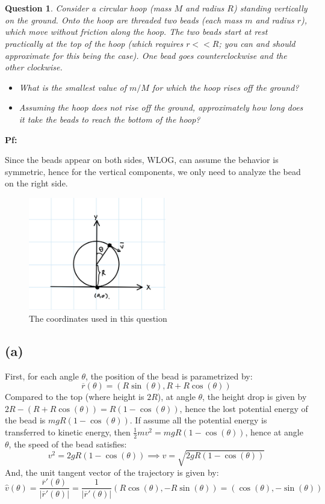 \documentclass{article}
\newtheorem{question}{Question}
\newcommand{\br}{\overline{r}}
\begin{document}
\break

\section{}%
\begin{question}\label{q4}
    Consider a circular hoop (mass $M$ and radius $R$) standing vertically on the ground. Onto the hoop are threaded two beads (each mass $m$ and radius $r$), which move without friction along the hoop. The two beads start at rest practically at the top of the hoop (which requires $r<<R$; you can and should approximate for this being the case). One bead goes counterclockwise and the other clockwise.
    \begin{itemize}
        \item[(a)] What is the smallest value of $m/M$ for which the hoop rises off the ground?
        \item[(b)] Assuming the hoop does not rise off the ground, approximately how long does it take the beads to reach the bottom of the hoop? 
    \end{itemize}
\end{question}

\textbf{Pf:}

Since the beads appear on both sides, WLOG, can assume the behavior is symmetric, hence for the vertical components, we only need to analyze the bead on the right side.

\begin{figure}[h!]
    \begin{center}
        \includegraphics[width = 60mm]{q4 coord.jpg}
        \caption{The coordinates used in this question}
    \end{center}
\end{figure}

\subsection*{(a)}
First, for each angle $\theta$, the position of the bead is parametrized by:
$$\br(\theta)=(R\sin(\theta), R+R\cos(\theta))$$
Compared to the top (where height is $2R$), at angle $\theta$, the height drop is given by $2R-(R+R\cos(\theta)) = R(1-\cos(\theta))$, hence the lost potential energy of the bead is $mgR(1-\cos(\theta))$. If assume all the potential energy is transferred to kinetic energy, then $\frac{1}{2}mv^2 = mgR(1-\cos(\theta))$, hence at angle $\theta$, the speed of the bead satisfies:
$$v^2 = 2gR(1-\cos(\theta))\implies v=\sqrt{2gR(1-\cos(\theta))}$$
And, the unit tangent vector of the trajectory is given by:
$$\hat{v}(\theta)=\frac{\br'(\theta)}{|\br'(\theta)|} = \frac{1}{|\br'(\theta)|}(R\cos(\theta), -R\sin(\theta)) = (\cos(\theta),-\sin(\theta))$$
\end{document}
